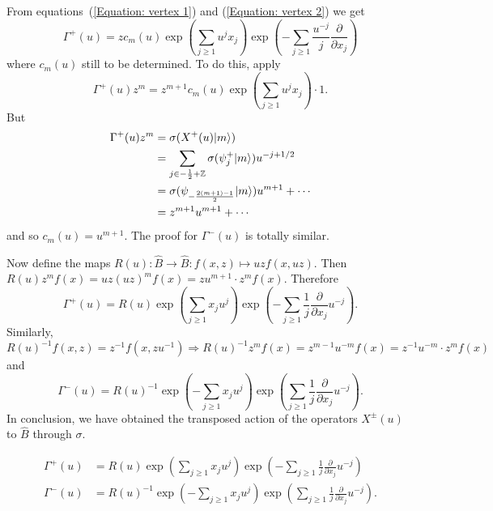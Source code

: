 From equations~(\ref{Equation: vertex 1}) and (\ref{Equation: vertex 2}) we get
\begin{equation}
    \Gamma^+(u)=zc_m(u)\exp\left(\sum_{j\geq1}u^jx_j\right)\exp\left(-\sum_{j\geq1}\frac{u^{-j}}{j}\frac{\partial}{\partial x_j}\right)
\end{equation}
where $c_m(u)$ still to be determined. To do this, apply 
\begin{equation}
    \Gamma^+(u)z^m=z^{m+1}c_m(u)\exp\left(\sum_{j\geq1}u^jx_j\right)\cdot 1.
\end{equation}
But 
\begin{equation}
    \begin{split}
        \Gamma^+(u)z^m&=\sigma(X^+(u)|m\rangle)\\
        &=\sum_{j\in-\frac{1}{2}+\mathbb{Z}}\sigma(\psi^+_j|m\rangle)u^{-j+1/2}\\
        &=\sigma(\psi_{-\frac{2(m+1)-1}{2}}|m\rangle)u^{m+1}+\cdots\\
        &=z^{m+1}u^{m+1}+\cdots
    \end{split}
\end{equation}
and so $c_m(u)=u^{m+1}$. The proof for $\Gamma^-(u)$ is totally similar.\par
Now define the maps $R(u):\hat{B}\rightarrow \hat{B}: f(x,z)\mapsto uzf(x,uz)$. Then $R(u) z^mf(x)=uz(uz)^mf(x)=zu^{m+1}\cdot z^mf(x)$. Therefore
\begin{equation}
    \Gamma^+(u) = R(u)\exp\left(\sum_{j\geq1}x_ju^j\right)\exp\left(-\sum_{j\geq1}\frac{1}{j}\frac{\partial}{\partial x_j}u^{-j}\right).
\end{equation}
Similarly, $R(u)^{-1}f(x,z)=z^{-1}f(x,zu^{-1})\Rightarrow R(u)^{-1}z^{m}f(x)=z^{m-1}u^{-m}f(x)=z^{-1}u^{-m}\cdot z^mf(x)$ and
\begin{equation}
    \Gamma^-(u)=R(u)^{-1}\exp\left(-\sum_{j\geq1}x_ju^j\right)\exp\left(\sum_{j\geq1}\frac{1}{j}\frac{\partial}{\partial x_j}u^{-j}\right).
\end{equation}
In conclusion, we have obtained the transposed action of the operators $X^\pm(u)$ to $\hat{B}$ through $\sigma$.
\begin{dang}
    \begin{theorem}\cite{kac2013bombay}
        \begin{equation}
            \begin{split}
                \Gamma^+(u) &= R(u)\exp\left(\sum_{j\geq1}x_ju^j\right)\exp\left(-\sum_{j\geq1}\frac{1}{j}\frac{\partial}{\partial x_j}u^{-j}\right)\\
                \Gamma^-(u)&=R(u)^{-1}\exp\left(-\sum_{j\geq1}x_ju^j\right)\exp\left(\sum_{j\geq1}\frac{1}{j}\frac{\partial}{\partial x_j}u^{-j}\right).
            \end{split}
        \end{equation}
    \end{theorem}
\end{dang}

